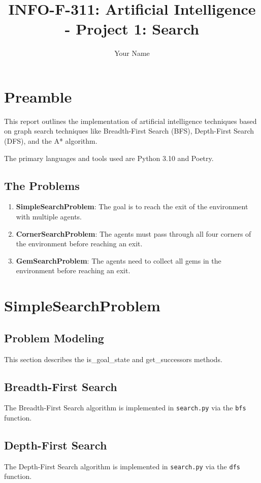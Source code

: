 \documentclass{article}
\title{INFO-F-311: Artificial Intelligence - Project 1: Search}
\author{Your Name}
\date{}
\begin{document}
\maketitle

\section{Preamble}
This report outlines the implementation of artificial intelligence techniques 
based on graph search techniques like 
Breadth-First Search (BFS), Depth-First Search (DFS), and the A* algorithm. 

The primary languages and tools used are Python 3.10 and Poetry.

\subsection{The Problems}
\begin{enumerate}
    \item \textbf{SimpleSearchProblem}: The goal is to reach the exit of the environment with multiple agents.
    \item \textbf{CornerSearchProblem}: The agents must pass through all four corners of the environment before reaching an exit.
    \item \textbf{GemSearchProblem}: The agents need to collect all gems in the environment before reaching an exit.
\end{enumerate}

\section{SimpleSearchProblem}

\subsection{Problem Modeling}
This section describes the is\_goal\_state and get\_successors methods.

\subsection{Breadth-First Search}
The Breadth-First Search algorithm is implemented in \texttt{search.py} via the \texttt{bfs} function.

\subsection{Depth-First Search}
The Depth-First Search algorithm is implemented in \texttt{search.py} via the \texttt{dfs} function.
\end{document}
